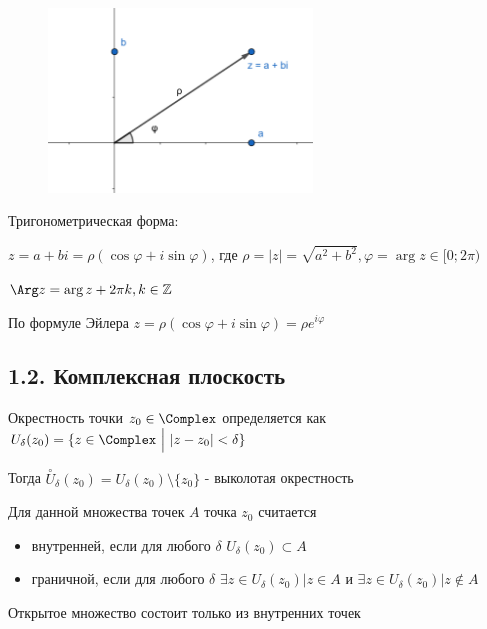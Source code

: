 \documentclass[12pt]{article}
\begin{document}
\begin{minipage}{\textwidth}

    \begin{figure}
        \includegraphics[width=7cm]{addchapters2/images/addchapters2_2025_02_07_6}
    \end{figure}

    Тригонометрическая форма:

    $z = a + bi = \rho (\cos \varphi + i \sin \varphi)$, где $\rho = |z| = \sqrt{a^2 + b^2}, \varphi = \arg z \in [0; 2\pi)$

    $\Arg z = \arg z + 2\pi k, k \in \Integer$

    По формуле Эйлера $z = \rho (\cos \varphi + i \sin \varphi) = \rho e^{i \varphi}$
\end{minipage}

\subsection{1.2. Комплексная плоскость}

\Def Окрестность точки $z_0 \in \Complex$ определяется как $U_\delta (z_0) = \{z \in \Complex \ \Big| \ |z - z_0| < \delta\}$

Тогда $\overset{\circ}{U}_\delta (z_0) = U_\delta (z_0) \setminus \{ z_0 \}$ - выколотая окрестность

\Def Для данной множества точек $A$ точка $z_0$ считается

\begin{itemize}
    \item внутренней, если для любого $\delta$ $U_\delta (z_0) \subset A$
    \item граничной, если для любого $\delta$ $\exists z \in U_\delta (z_0) \Big| z \in A$ и $\exists z \in U_\delta (z_0) \Big| z \notin A$
\end{itemize}

\Def Открытое множество состоит только из внутренних точек
\end{document}

